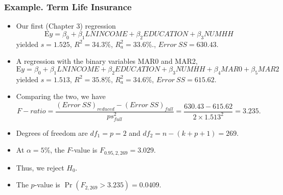\begin{frame}[shrink=2]
 \frametitle{Example. Term Life Insurance}
   \begin{itemize}
 \item Our first (Chapter 3) regression
   \begin{equation*}
\mathrm{E}y = \beta_0 + \beta_1 LNINCOME +\beta_2 EDUCATION +
\beta_3 NUMHH
\end{equation*}
yielded $s=1.525$, $R^2=34.3\%$, $R_a^2= 33.6\%.$, $Error~SS =630.43
$.

   \item A regression with the binary variables MAR0 and MAR2,
   \begin{equation*}
\mathrm{E}y = \beta_0 + \beta_1 LNINCOME +\beta_2 EDUCATION +
\beta_3 NUMHH + \beta_4 MAR0 + \beta_5 MAR2
\end{equation*}
yielded $s= 1.513$, $R^2 = 35.8\%$, $R_a^2 = 34.6\%$, $Error~SS =
615.62$.
\item Comparing the two, we have
\begin{equation*}
F-ratio=\frac{(Error~SS)_{reduced}-(Error~SS)_{full}}{ps_{full}^{2}}
= \frac{630.43 -615.62}{2 \times 1.513^2} = 3.235.
\end{equation*}
\item Degrees of freedom are $df_1=p=2$ and $df_2 = n-(k+p+1) = 269$.
\item At $\alpha = 5\%$, the $F$-value is $F_{0.95,2,269} =
3.029$.
\item Thus, we reject $H_0$.
\item The $p$-value is $\Pr( F_{2,269} > 3.235) = 0.0409$.
\end{itemize}
\end{frame}

